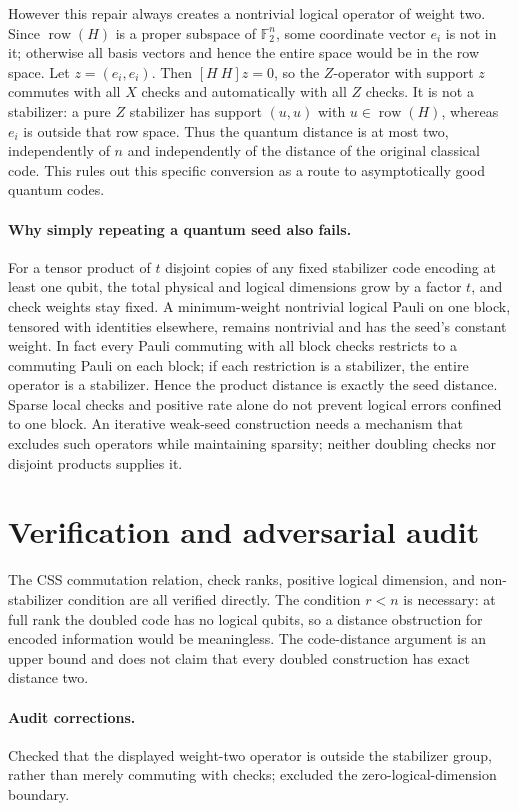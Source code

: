 \documentclass[11pt]{article}
\begin{document}
However this repair always creates a nontrivial logical operator of weight two. Since $\operatorname{row}(H)$ is a proper subspace of $\mathbb F_2^n$, some coordinate vector $e_i$ is not in it; otherwise all basis vectors and hence the entire space would be in the row space. Let $z=(e_i,e_i)$. Then $[H\ H]z=0$, so the $Z$-operator with support $z$ commutes with all $X$ checks and automatically with all $Z$ checks. It is not a stabilizer: a pure $Z$ stabilizer has support $(u,u)$ with $u\in\operatorname{row}(H)$, whereas $e_i$ is outside that row space. Thus the quantum distance is at most two, independently of $n$ and independently of the distance of the original classical code. This rules out this specific conversion as a route to asymptotically good quantum codes.

\paragraph{Why simply repeating a quantum seed also fails.}
For a tensor product of $t$ disjoint copies of any fixed stabilizer code encoding at least one qubit, the total physical and logical dimensions grow by a factor $t$, and check weights stay fixed. A minimum-weight nontrivial logical Pauli on one block, tensored with identities elsewhere, remains nontrivial and has the seed's constant weight. In fact every Pauli commuting with all block checks restricts to a commuting Pauli on each block; if each restriction is a stabilizer, the entire operator is a stabilizer. Hence the product distance is exactly the seed distance. Sparse local checks and positive rate alone do not prevent logical errors confined to one block. An iterative weak-seed construction needs a mechanism that excludes such operators while maintaining sparsity; neither doubling checks nor disjoint products supplies it.
\section{Verification and adversarial audit}
The CSS commutation relation, check ranks, positive logical dimension, and non-stabilizer condition are all verified directly. The condition $r<n$ is necessary: at full rank the doubled code has no logical qubits, so a distance obstruction for encoded information would be meaningless. The code-distance argument is an upper bound and does not claim that every doubled construction has exact distance two.
\paragraph{Audit corrections.} Checked that the displayed weight-two operator is outside the stabilizer group, rather than merely commuting with checks; excluded the zero-logical-dimension boundary.
\end{document}
